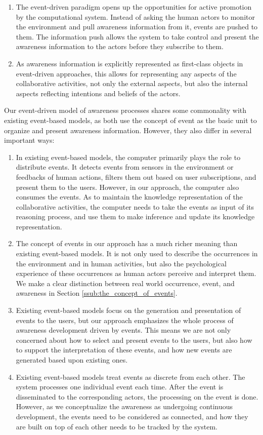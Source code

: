 \begin{enumerate}
   \item The event-driven paradigm opens up the opportunities for active promotion by the computational system. Instead of asking the human actors to monitor the environment and pull awareness information from it, events are pushed to them. The information push allows the system to take control and present the awareness information to the actors before they subscribe to them.
   \item As awareness information is explicitly represented as first-class objects in event-driven approaches, this allows for representing any aspects of the collaborative activities, not only the external aspects, but also the internal aspects reflecting intentions and beliefs of the actors.
\end{enumerate}

Our event-driven model of awareness processes shares some commonality with existing event-based models, as both use the concept of event as the basic unit to organize and present awareness information. However, they also differ in several important ways:

\begin{enumerate}
   \item In existing event-based models, the computer primarily plays the role to distribute events. It detects events from sensors in the environment or feedbacks of human actions, filters them out based on user subscriptions, and present them to the users. However, in our approach, the computer also consumes the events. As to maintain the knowledge representation of the collaborative activities, the computer needs to take the events as input of its reasoning process, and use them to make inference and update its knowledge representation. 
   \item The concept of events in our approach has a much richer meaning than existing event-based models. It is not only used to describe the occurrences in the environment and in human activities, but also the psychological experience of these occurrences as human actors perceive and interpret them. We make a clear distinction between real world occurrence, event, and awareness in Section \ref{ssub:the_concept_of_events}.
   \item Existing event-based models focus on the generation and presentation of events to the users, but our approach emphasizes the whole process of awareness development driven by events. This means we are not only concerned about how to select and present events to the users, but also how to support the interpretation of these events, and how new events are generated based upon existing ones.
   \item Existing event-based models treat events as discrete from each other. The system processes one individual event each time. After the event is disseminated to the corresponding actors, the processing on the event is done. However, as we conceptualize the awareness as undergoing continuous development, the events need to be considered as connected, and how they are built on top of each other needs to be tracked by the system.
\end{enumerate}

